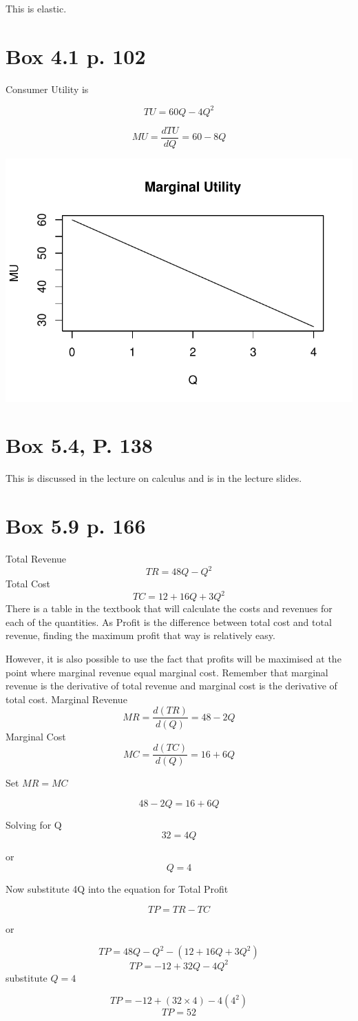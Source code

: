 \documentclass[12pt, a4paper, oneside]{article}\usepackage[]{graphicx}\usepackage[]{color}
\makeatletter
\def\maxwidth{ %
  \ifdim\Gin@nat@width>\linewidth
    \linewidth
  \else
    \Gin@nat@width
  \fi
}
\newenvironment{knitrout}{}{} %
\makeatother
\begin{document}
This is elastic.

\section{Box 4.1 p. 102}
Consumer Utility is 

$$TU = 60Q - 4Q^2$$

$$MU = \frac{dTU}{dQ} = 60 - 8Q$$

\begin{knitrout}
\color{fgcolor}
\includegraphics[width=\maxwidth]{figure/MU} 

\end{knitrout}


\section{Box 5.4, P. 138}
This is discussed in the lecture on calculus and is in the lecture slides.

\section{Box 5.9 p. 166}
Total Revenue
$$TR = 48Q - Q^2$$
Total Cost 
$$TC = 12 + 16Q +3Q^2$$
There is a table in the textbook that will calculate the costs and revenues for each of the quantities.  As Profit is the difference between total cost and total revenue, finding the maximum profit that way is relatively easy. 

However, it is also possible to use the fact that profits will be maximised at the point where marginal revenue equal marginal cost. Remember that marginal revenue is the derivative of total revenue and marginal cost is the derivative of total cost. 
Marginal Revenue
$$ MR = \frac{d(TR)}{d(Q)} = 48 - 2Q$$
Marginal Cost
$$MC = \frac{d(TC)}{d(Q)} = 16 +6Q$$

Set $MR = MC$

$$48 - 2Q = 16 + 6Q$$

Solving for Q
$$32 = 4Q$$

or
$$Q = 4$$

Now substitute 4Q into the equation for Total Profit

$$TP = TR - TC$$

or 

$$TP = 48Q - Q^2 - (12 + 16Q +3Q^2)$$
$$TP = -12 + 32Q - 4Q^2$$
 substitute $Q = 4$
 
$$TP = -12 +(32 \times 4) - 4(4^2)$$
$$TP = 52$$
\end{document}
